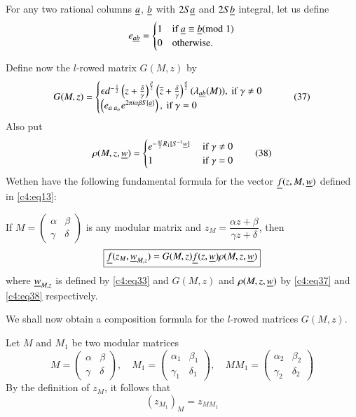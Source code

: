 For any two rational columns $\underline{a}$, $\underline{b}$ with $2S\underline{a}$ and
$2S\underline{b}$ integral, let us define
$$
e_{\underline{a}\underline{b}}=
\begin{cases}
1 & \text{if } \underline{a}\equiv \underline{b}(\rm{mod} \; 1)\\
0 & \text{otherwise.}
\end{cases}
$$

Define now the $l$-rowed matrix $G(M,z)$ by
\begin{equation*}
G(M,z)=
\begin{cases}
\epsilon
d^{-\frac{1}{2}}\left(z+\frac{\delta}{\gamma}\right)^{\frac{p}{2}}\left(\overline{z}+\frac{\delta}{\gamma}\right)^{\frac{q}{2}}(\lambda_{\underline{a}\underline{b}}(M)),
\text{ if } \gamma\neq 0\\
\left(e_{a \; a_\alpha}e^{2\pi i\alpha \beta
  S[\underline{a}]}\right),\text{ if } \gamma=0
\end{cases}\tag{37}\label{c4:eq37}
\end{equation*}
Also put
\begin{equation*}
\rho(M,z,\underline{w})=
\begin{cases}
e^{-\frac{\pi i}{2}R_{1}[S^{-1}\underline{w}]} & \text{ if } \gamma\neq 0\\
1 & \text{ if } \gamma=0
\end{cases}\tag{38}\label{c4:eq38}
\end{equation*}
We\pageoriginale then have the following fundamental formula for the
vector $\ub{f}(z,M,\break\ub{w})$ defined in \eqref{c4:eq13}:

\setcounter{thm}{0}
\begin{thm}\label{chap4:thm1}
If $M=\left(\begin{smallmatrix} \alpha & \beta\\ \gamma & \delta
\end{smallmatrix}\right)$ is any modular matrix and
$z_{M}=\dfrac{\alpha z+\beta}{\gamma z+\delta}$, then
$$
\boxed{\underline{f}(z_{M},\underline{w}_{M,z})=G(M,z)\underline{f}(z,\underline{w})\rho(M,z,\underline{w})}
$$
where $\underline{w}_{M,z}$ is defined by \eqref{c4:eq33} and $G(M,z)$ and
$\rho(M,z,\underline{w})$ by \eqref{c4:eq37} and \eqref{c4:eq38} respectively.
\end{thm}

We shall now obtain a composition formula for the $l$-rowed matrices
$G(M,z)$.

Let $M$ and $M_{1}$ be two modular matrices
$$
M=
\begin{pmatrix}
\alpha & \beta\\
\gamma & \delta
\end{pmatrix},\quad M_{1}=
\begin{pmatrix}
\alpha_{1} & \beta_{1}\\
\gamma_{1} & \delta_{1}
\end{pmatrix},\quad 
MM_{1}=
\begin{pmatrix}
\alpha_{2} & \beta_{2}\\
\gamma_{2} & \delta_{2}
\end{pmatrix}
$$
By the definition of $z_{M}$, it follows that
\begin{equation*}
(z_{M_{1}})_{M}=z_{MM_{1}}\tag{39}\label{c4:eq39}
\end{equation*}

